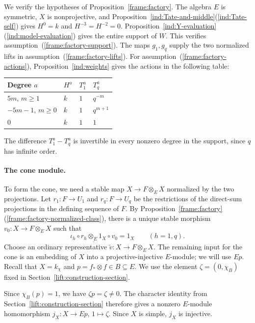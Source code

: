 \documentclass[11pt]{article}
\begin{document}
We verify the hypotheses of Proposition~\ref{frame:factory}.
The algebra $E$ is symmetric, $X$ is nonprojective, and
Proposition~\ref{ind:Tate-and-middle}\textup{(\ref{ind:Tate-self})} gives $H^0=k$ and
$H^{-3}=H^{-2}=0$. Proposition~\ref{ind:Y-evaluation}\textup{(\ref{ind:model-evaluation})}
gives the entire support of $W$.
This verifies assumption~\textup{(\ref{frame:factory-support})}. The maps $g_1,g_q$
supply the two normalized lifts in assumption~\textup{(\ref{frame:factory-lifts})}.
For assumption~\textup{(\ref{frame:factory-actions})},
Proposition~\ref{ind:weights} gives the actions in the following table:
\begin{center}
\begin{tabular}{@{}llll@{}}
\hline
Degree $a$ & $H^a$ & $T_1^a$ & $T_q^a$\\
\hline
$5m$, $m\ge1$ & $k$ & $1$ & $q^{-m}$\\
$-5m-1$, $m\ge0$ & $k$ & $1$ & $q^{m+1}$\\
$0$ & $k$ & $1$ & $1$\\
\hline
\end{tabular}
\end{center}
The difference $T_1^a-T_q^a$ is invertible in every
nonzero degree in the support, since $q$ has infinite order.

\paragraph{The cone module.}

To form the cone, we need a stable map $X\to F\otimes_E X$
normalized by the two projections. Let $r_1:F\to U_1$ and
$r_q:F\to U_q$ be the restrictions of the direct-sum projections in the defining
sequence of $F$. By Proposition~\ref{frame:factory}\textup{(\ref{frame:factory-normalized-class})},
there is a unique stable morphism $v_0:X\to F\otimes_E X$ such that
\[
 \iota_h\circ\underline{r_h\otimes_E1_X}\circ v_0=1_X
 \qquad(h=1,q).
\]
Choose an ordinary representative
$\widetilde v:X\to F\otimes_EX$. The remaining input for the
cone is an embedding of $X$ into a projective-injective $E$-module;
we will use $Ep$. Recall that $X=k_\chi$ and
$p=f_*\otimes f\in B\subseteq E$. We use the element $\zeta=(0, \chi_B)$
fixed in Section~\ref{lift:construction-section}.

Since $\chi_B(p)=1$, we have $\zeta p=\zeta\ne0$. The character
identity from Section~\ref{lift:construction-section} therefore gives
a nonzero $E$-module homomorphism $j_X:X\to Ep$, $1\mapsto\zeta$.
Since $X$ is simple, $j_X$ is injective.
\end{document}
